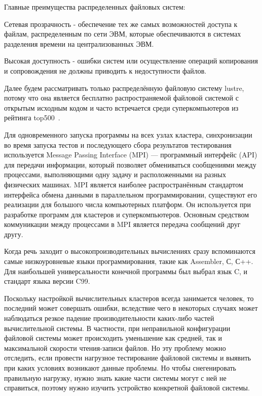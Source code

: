 Главные преимущества распределенных файловых систем:

Сетевая прозрачность - обеспечение тех же самых возможностей доступа к файлам, распределенным по сети
ЭВМ, которые обеспечиваются в системах разделения времени на централизованных ЭВМ.
~\cite{distributed_operating_systems_course}

Высокая доступность - ошибки систем или осуществление операций копирования и сопровождения не должны
приводить к недоступности файлов.~\cite{distributed_operating_systems_course}


Далее будем рассматривать только распределённую файловую систему lustre, потому что она является
бесплатно распространяемой файловой системой с открытым исходным кодом и часто встречается среди суперкомпьютеров 
из рейтинга top500~\cite{top500}.

Для одновременного запуска программы на всех узлах кластера, синхронизации во время запуска тестов и
последующего сбора результатов тестирования используется Message Passing Interface (MPI) --- программный 
интерфейс (API) для передачи информации, который позволяет обмениваться сообщениями между процессами,
выполняющими одну задачу и расположенными на разных физических машинах. 
MPI является наиболее распространённым стандартом интерфейса обмена данными
в параллельном программировании, существуют его реализации для большого числа компьютерных платформ.
Он используется при разработке программ для кластеров и суперкомпьютеров. Основным средством коммуникации
между процессами в MPI является передача сообщений друг другу.

Когда речь заходит о высокопроизводительных вычислениях сразу вспоминаются самые низкоуровневые
языки программирования, такие как Assembler, С, С++. Для наибольшей универсальности конечной программы
был выбрал язык C, и стандарт языка версии C99.

Поскольку настройкой вычислительных кластеров всегда занимается человек, то последний может совершать
ошибки, вследствие чего в некоторых случаях может наблюдаться резкое падение производительности каких-либо
частей вычислительной системы. В частности, при неправильной конфигурации файловой системы может
происходить уменьшение как средней, так и максимальной скорости чтения-записи файлов. Но эту проблему
можно отследить, если провести нагрузное тестирование файловой системы и выявить при каких условиях
возникают данные проблемы. Но чтобы снегенировать правильную нагрузку, нужно знать какие части системы
могут с ней не справиться, поэтому нужно изучить устройство конкретной файловой системы.

